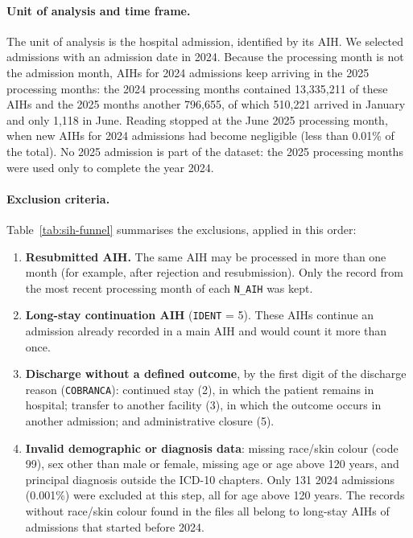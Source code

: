 \paragraph{Unit of analysis and time frame.}
The unit of analysis is the hospital admission, identified by its AIH. We
selected admissions with an admission date in 2024. Because the processing
month is not the admission month, AIHs for 2024 admissions keep arriving in the
2025 processing months: the 2024 processing months contained 13,335,211 of
these AIHs and the 2025 months another 796,655, of which 510,221 arrived in
January and only 1,118 in June. Reading stopped at the June 2025 processing
month, when new AIHs for 2024 admissions had become negligible (less than
0.01\% of the total). No 2025 admission is part of the dataset: the 2025
processing months were used only to complete the year 2024.

\paragraph{Exclusion criteria.}
Table~\ref{tab:sih-funnel} summarises the exclusions, applied in this order:
\begin{enumerate}
  \item \textbf{Resubmitted AIH.} The same AIH may be processed in more than one
    month (for example, after rejection and resubmission). Only the record from
    the most recent processing month of each \texttt{N\_AIH} was kept.
  \item \textbf{Long-stay continuation AIH} (\texttt{IDENT} = 5). These AIHs
    continue an admission already recorded in a main AIH and would count it
    more than once.
  \item \textbf{Discharge without a defined outcome}, by the first digit of the
    discharge reason (\texttt{COBRANCA}): continued stay (2), in which the
    patient remains in hospital; transfer to another facility (3), in which the
    outcome occurs in another admission; and administrative closure (5).
  \item \textbf{Invalid demographic or diagnosis data}: missing race/skin colour
    (code 99), sex other than male or female, missing age or age above 120
    years, and principal diagnosis outside the ICD-10 chapters. Only 131 2024
    admissions (0.001\%) were excluded at this step, all for age above
    120 years. The records without race/skin
    colour found in the files all belong to long-stay AIHs of admissions that
    started before 2024.
\end{enumerate}

